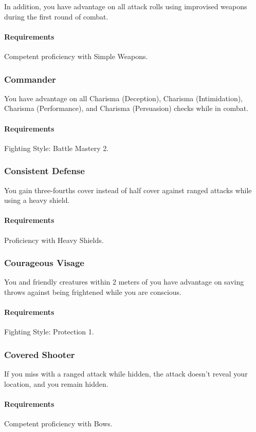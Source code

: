     In addition, you have advantage on all attack rolls using improvised weapons during the first round of combat.
    \paragraph{Requirements} Competent proficiency with Simple Weapons.
\subsubsection{Commander} \label{feat::commander}
    You have advantage on all Charisma (Deception), Charisma (Intimidation), Charisma (Performance), and Charisma (Persuasion) checks while in combat.
    \paragraph{Requirements} Fighting Style: Battle Mastery 2.
\subsubsection{Consistent Defense} \label{feat::consistentdefense}
    You gain three-fourths cover instead of half cover against ranged attacks while using a heavy shield.
    \paragraph{Requirements} Proficiency with Heavy Shields.
\subsubsection{Courageous Visage} \label{feat::courageousvisage}
    You and friendly creatures within 2 meters of you have advantage on saving throws against being frightened while you are conscious.
    \paragraph{Requirements} Fighting Style: Protection 1.
\subsubsection{Covered Shooter} \label{feat::coveredshooter}
    If you miss with a ranged attack while hidden, the attack doesn't reveal your location, and you remain hidden.
    \paragraph{Requirements} Competent proficiency with Bows.
